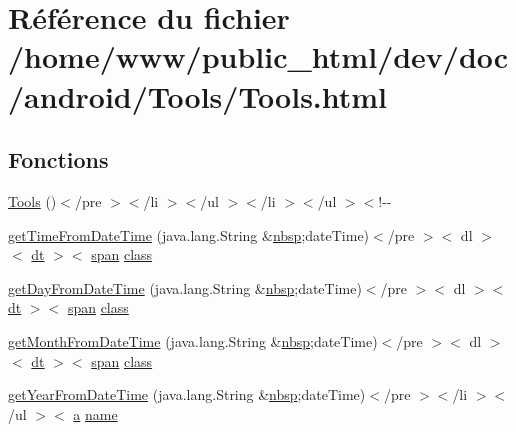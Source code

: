 \hypertarget{_tools_8html}{\section{Référence du fichier /home/www/public\-\_\-html/dev/doc/android/\-Tools/\-Tools.html}
\label{_tools_8html}
}
\subsection*{Fonctions}
\begin{DoxyCompactItemize}
\item 
\hyperlink{_tools_8html_a5bc1ab07e2d40a6a76f9e1602174b09b}{Tools} ()$<$/pre $>$$<$/li $>$$<$/ul $>$$<$/li $>$$<$/ul $>$$<$!-\/-\/
\item 
\hyperlink{_tools_8html_ab725c5bc6dc511d8627ce9f3affd2a4a}{get\-Time\-From\-Date\-Time} (java.\-lang.\-String \&\hyperlink{_tools_8html_aef915316f784c9063d942974538301a6}{nbsp};date\-Time)$<$/pre $>$$<$ dl $>$$<$ \hyperlink{stylesheet_8css_a107565fb4039d33b041380d6e0ea1d80}{dt} $>$$<$ \hyperlink{stylesheet_8css_a8343996ebcf16220b04e54659aac31cc}{span} \hyperlink{_tools_8html_acf06f836132665ba8114f5a414c2403f}{class}
\item 
\hyperlink{_tools_8html_a04c076528335dbe705287b02feed29f4}{get\-Day\-From\-Date\-Time} (java.\-lang.\-String \&\hyperlink{_tools_8html_aef915316f784c9063d942974538301a6}{nbsp};date\-Time)$<$/pre $>$$<$ dl $>$$<$ \hyperlink{stylesheet_8css_a107565fb4039d33b041380d6e0ea1d80}{dt} $>$$<$ \hyperlink{stylesheet_8css_a8343996ebcf16220b04e54659aac31cc}{span} \hyperlink{_tools_8html_acf06f836132665ba8114f5a414c2403f}{class}
\item 
\hyperlink{_tools_8html_a3bd46c459028bb9e40593838239d1692}{get\-Month\-From\-Date\-Time} (java.\-lang.\-String \&\hyperlink{_tools_8html_aef915316f784c9063d942974538301a6}{nbsp};date\-Time)$<$/pre $>$$<$ dl $>$$<$ \hyperlink{stylesheet_8css_a107565fb4039d33b041380d6e0ea1d80}{dt} $>$$<$ \hyperlink{stylesheet_8css_a8343996ebcf16220b04e54659aac31cc}{span} \hyperlink{_tools_8html_acf06f836132665ba8114f5a414c2403f}{class}
\item 
\hyperlink{_tools_8html_a8a8e210d023007dcaad3dd958ad3ece9}{get\-Year\-From\-Date\-Time} (java.\-lang.\-String \&\hyperlink{_tools_8html_aef915316f784c9063d942974538301a6}{nbsp};date\-Time)$<$/pre $>$$<$/li $>$$<$/ul $>$$<$ \hyperlink{style_8css_a5e8981582017bb8b84c21f148345d1f7}{a} \hyperlink{_cloudia_d_b_8html_ab74e6bf80237ddc4109968cedc58c151}{name}
$$
\end{DoxyCompactItemize}

